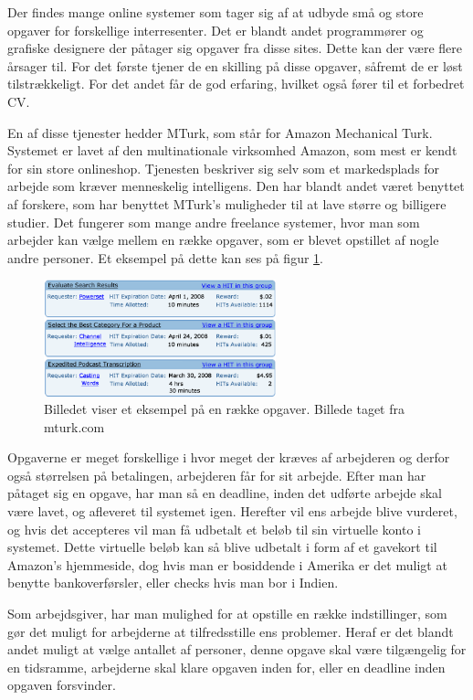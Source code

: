 Der findes mange online systemer som tager sig af at udbyde små og store opgaver for forskellige interresenter. Det er blandt andet programmører og grafiske designere der påtager sig opgaver fra disse sites. Dette kan der være flere årsager til. For det første tjener de en skilling på disse opgaver, såfremt de er løst tilstrækkeligt. For det andet får de god erfaring, hvilket også fører til et forbedret CV.

En af disse tjenester hedder MTurk, som står for Amazon Mechanical Turk. Systemet er lavet af den multinationale virksomhed Amazon, som mest er kendt for sin store onlineshop. Tjenesten beskriver sig selv som et markedsplads for arbejde som kræver menneskelig intelligens.\cite{MTurk} Den har blandt andet været benyttet af forskere, som har benyttet MTurk's muligheder til at lave større og billigere studier.\cite{Sciencemag} Det fungerer som mange andre freelance systemer, hvor man som arbejder kan vælge mellem en række opgaver, som er blevet opstillet af nogle andre personer. Et eksempel på dette kan ses på figur \ref{MTurkILL}.

\begin{figure}[H]
\centering
\includegraphics[width=0.6\textwidth]{Billeder/MTurk.png}
\caption{Billedet viser et eksempel på en række opgaver. Billede taget fra mturk.com\cite{MTurkIMG}}
\label{MTurkILL}
\end{figure}

Opgaverne er meget forskellige i hvor meget der kræves af arbejderen og derfor også størrelsen på betalingen, arbejderen får for sit arbejde. Efter man har påtaget sig en opgave, har man så en deadline, inden det udførte arbejde skal være lavet, og afleveret til systemet igen. Herefter vil ens arbejde blive vurderet, og hvis det accepteres vil man få udbetalt et beløb til sin virtuelle konto i systemet. Dette virtuelle beløb kan så blive udbetalt i form af et gavekort til Amazon’s hjemmeside, dog hvis man er bosiddende i Amerika er det muligt at benytte bankoverførsler, eller checks hvis man bor i Indien.\cite{MTurk2}

Som arbejdsgiver, har man mulighed for at opstille en række indstillinger, som gør det muligt for arbejderne at tilfredsstille ens problemer. Heraf er det blandt andet muligt at vælge antallet af personer, denne opgave skal være tilgængelig for en tidsramme, arbejderne skal klare opgaven inden for, eller en deadline inden opgaven forsvinder.

